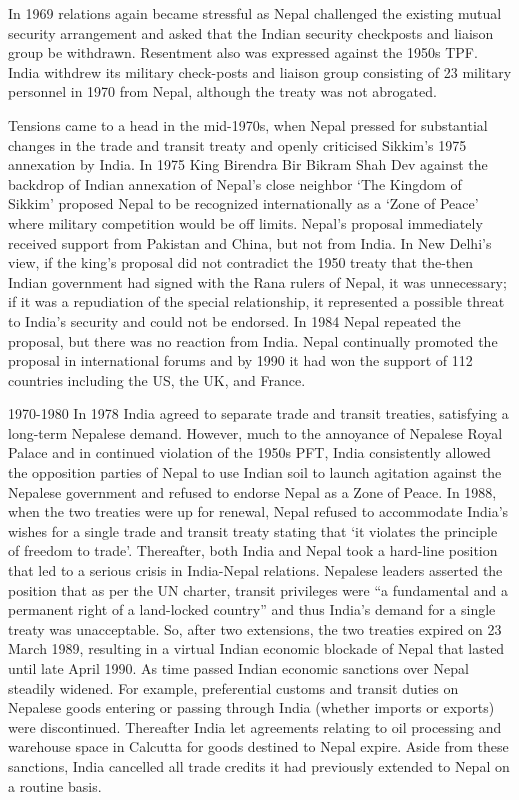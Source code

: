 \documentclass[
  openany]{book}
\begin{document}
In 1969 relations again became stressful as Nepal challenged the existing mutual security arrangement and asked that the Indian security checkposts and liaison group be withdrawn. Resentment also was expressed against the 1950s TPF. India withdrew its military check-posts and liaison group consisting of 23 military personnel in 1970 from Nepal, although the treaty was not abrogated.

Tensions came to a head in the mid-1970s, when Nepal pressed for substantial changes in the trade and transit treaty and openly criticised Sikkim's 1975 annexation by India. In 1975 King Birendra Bir Bikram Shah Dev against the backdrop of Indian annexation of Nepal's close neighbor `The Kingdom of Sikkim' proposed Nepal to be recognized internationally as a `Zone of Peace' where military competition would be off limits. Nepal's proposal immediately received support from Pakistan and China, but not from India. In New Delhi's view, if the king's proposal did not contradict the 1950 treaty that the-then Indian government had signed with the Rana rulers of Nepal, it was unnecessary; if it was a repudiation of the special relationship, it represented a possible threat to India's security and could not be endorsed. In 1984 Nepal repeated the proposal, but there was no reaction from India. Nepal continually promoted the proposal in international forums and by 1990 it had won the support of 112 countries including the US, the UK, and France.

1970-1980
In 1978 India agreed to separate trade and transit treaties, satisfying a long-term Nepalese demand. However, much to the annoyance of Nepalese Royal Palace and in continued violation of the 1950s PFT, India consistently allowed the opposition parties of Nepal to use Indian soil to launch agitation against the Nepalese government and refused to endorse Nepal as a Zone of Peace. In 1988, when the two treaties were up for renewal, Nepal refused to accommodate India's wishes for a single trade and transit treaty stating that `it violates the principle of freedom to trade'. Thereafter, both India and Nepal took a hard-line position that led to a serious crisis in India-Nepal relations. Nepalese leaders asserted the position that as per the UN charter, transit privileges were ``a fundamental and a permanent right of a land-locked country'' and thus India's demand for a single treaty was unacceptable. So, after two extensions, the two treaties expired on 23 March 1989, resulting in a virtual Indian economic blockade of Nepal that lasted until late April 1990. As time passed Indian economic sanctions over Nepal steadily widened. For example, preferential customs and transit duties on Nepalese goods entering or passing through India (whether imports or exports) were discontinued. Thereafter India let agreements relating to oil processing and warehouse space in Calcutta for goods destined to Nepal expire. Aside from these sanctions, India cancelled all trade credits it had previously extended to Nepal on a routine basis.
\end{document}
